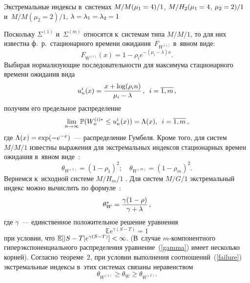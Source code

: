 \begin{multicols}{2}
{\begin{center}
\end{center}



\noindent
{\small Экстремальные индексы в~системах $M/M(\mu_1\hm=4)/1$, 
$M/H_2(\mu_1\hm=4$, $\mu_2\hm=2)/1$ и~$M/M(\mu_2=2)/1$,  $\lambda\hm=\lambda_1\hm=\lambda_2\hm=1$
}}


\vspace*{9pt}

Поскольку $\Sigma^{(1)}$ и~$\Sigma^{(m)}$  относятся к~системам  типа $M/M/1$, 
то для них  известна ф.~р.\ стационарного времени ожидания~$F_{W^{(i)}}$ 
в~явном виде:
\begin{equation*}
F_{W^{(i)}}(x) =1-\rho_i e^{-(\mu_i-\lambda)x}.
\end{equation*}
Выбирая нормализующие последовательности для максимума стационарного времени 
ожидания вида 
\begin{equation*}
 \label{expun}
 u_n^{i}(x) = \displaystyle\frac{\displaystyle x + \log (\rho_i n)\mathstrut}{\displaystyle \mu_i - \lambda\mathstrut}\,, \enskip i=\overline{1,m}\,,
  \end{equation*}
получим  его предельное распределение~\cite{iglehart}
\begin{equation*}
   \lim\limits_{n\to\infty} \mathbb{P} ( W_n^{(i)*}  \le u_n^{i}(x)) = \Lambda(x),  \enskip i=\overline{1,m}\,,
\end{equation*}
где $\Lambda(x) \hm= \exp (- e^{-x})$~--- распределение Гумбеля.
Кроме того, для систем $M/M/1$ известны  выражения для экстремальных индексов  
стационарных времен ожидания в~явном виде~\cite{Hooghiemstra}:
$$
\theta_{W^{(1)}}=(1-\rho_1)^2; \quad  \theta_{W^{(m)}}=(1-\rho_m)^2.
$$
Вернемся к~исходной системе $M/H_m/1$ . Для  сис\-тем $M/G/1$  экстремальный 
индекс  можно вычислить по формуле~\cite{Hooghiemstra}:
\begin{equation*}
    \theta_W^*= \displaystyle\frac{\displaystyle \gamma (1-\rho)\mathstrut}{\displaystyle \gamma + \lambda\mathstrut}\,,
\end{equation*}
где $\gamma$~--- единственное положительное решение уравнения
\begin{equation}
\label{gamma}
\mathbb{E} e^{\gamma(S-T)}=1
\end{equation}
при условии, что $\mathbb{E} [ |S-T|e^{\gamma(S-T)}] \hm< \infty$. (В~случае $m$-ком\-по\-нент\-но\-го 
гиперэкспоненциального распределения
уравнение~(\ref{gamma}) имеет несколько корней). Согласно тео\-ре\-ме~2,
при условии выполнения соотношений~(\ref{failure}) экстремальные индексы в~этих 
сис\-те\-мах связаны неравенством
\begin{equation*}
  \theta_{W^{(1)}}\ge  \theta_{W}\ge  \theta_{W^{(2)}}.

\end{equation*}
\end{multicols}
